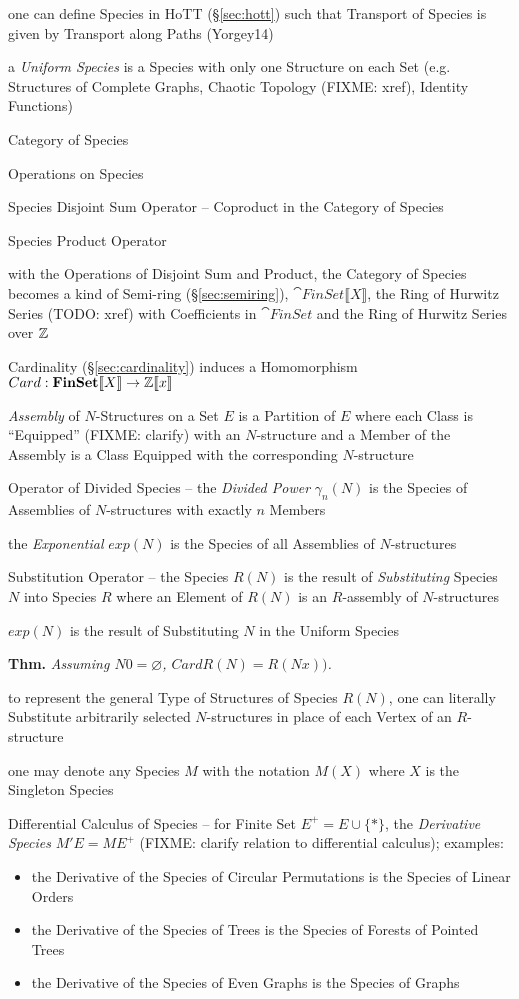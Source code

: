 one can define Species in HoTT (\S\ref{sec:hott}) such that Transport of Species
is given by Transport along Paths (Yorgey14)

a \emph{Uniform Species} is a Species with only one Structure on each Set (e.g.
Structures of Complete Graphs, Chaotic Topology (FIXME: xref), Identity
Functions)

Category of Species

Operations on Species

Species Disjoint Sum Operator -- Coproduct in the Category of Species

Species Product Operator

with the Operations of Disjoint Sum and Product, the
Category of Species becomes a kind of Semi-ring (\S\ref{sec:semiring}),
$\cat{FinSet}\llbracket{X}\rrbracket$, the Ring of Hurwitz Series (TODO: xref)
with Coefficients in $\cat{FinSet}$ and the Ring of Hurwitz Series over $\mathbb{Z}$

Cardinality (\S\ref{sec:cardinality}) induces a Homomorphism
$Card : \mathbf{FinSet}\llbracket{X}\rrbracket \rightarrow \mathbb{Z}\llbracket{x}\rrbracket$

\emph{Assembly} of $N$-Structures on a Set $E$ is a Partition of $E$ where each
Class is ``Equipped'' (FIXME: clarify) with an $N$-structure and a Member of the
Assembly is a Class Equipped with the corresponding $N$-structure

Operator of Divided Species -- the \emph{Divided Power} $\gamma_n(N)$ is the
Species of Assemblies of $N$-structures with exactly $n$ Members

the \emph{Exponential} $exp(N)$ is the Species of all Assemblies of
$N$-structures

Substitution Operator -- the Species $R(N)$ is the result of \emph{Substituting}
Species $N$ into Species $R$ where an Element of $R(N)$ is an $R$-assembly of
$N$-structures

$exp(N)$ is the result of Substituting $N$ in the Uniform Species

\textbf{Thm.} \emph{Assuming $N 0 = \varnothing$, $Card R(N) = R(N x))$.}

to represent the general Type of Structures of Species $R(N)$, one can literally
Substitute arbitrarily selected $N$-structures in place of each Vertex of an
$R$-structure

one may denote any Species $M$ with the notation $M(X)$ where $X$ is the
Singleton Species

Differential Calculus of Species -- for Finite Set $E^+ = E \cup \{*\}$, the
\emph{Derivative Species} $M' E = M E^+$
(FIXME: clarify relation to differential calculus); examples:
\begin{itemize}
  \item the Derivative of the Species of Circular Permutations is the Species of
    Linear Orders
  \item the Derivative of the Species of Trees is the Species of Forests of
    Pointed Trees
  \item the Derivative of the Species of Even Graphs is the Species of Graphs
\end{itemize}

